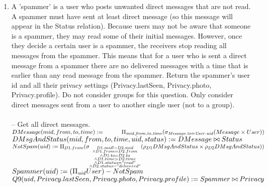 \documentclass{article}
\newcommand{\var}[1]{\mathit{#1}}
\begin{document}
\begin{enumerate}
\item   %
A 'spammer' is a user who posts unwanted direct messages that are not read. A spammer must have sent at least direct message (so this message will appear in the Status relation). Because users may not be aware that someone is a spammer, they may read some of their initial messages. However, once they decide a certain user is a spammer, the receivers stop reading all messages from the spammer. This means that for a user who is sent a direct message from a spammer there are no delivered messages with a time that is earlier than any read message from the spammer. Return the spammer's user id and all their privacy settings (Privacy.lastSeen, Privacy.photo, Privacy.profile). Do not consider groups for this question. Only consider direct messages sent from a user to another single user (not to a group). \\\\ [5pt]
\large{
\hspace*{1cm} -- Get all direct messages. \\ [5pt]
$
DMessage(mid, from, to, time) := \\
\hspace*{1cm} \Pi_{\var{mid}, \var{from}, \var{to}, \var{time}} 
(\sigma_{\var{Message.to} = \var{User.uid}} (Message \times User)) \\\\ [5pt]
$
$DMsgAndStatus(mid, from, to, time, uid, status) := DMessage \bowtie Status \\\\ [5pt]
$
$
NotSpam(uid) := \\
\Pi_{D1.from} (\sigma_{\substack{D1.mid != D2.mid \\
																\wedge D1.from =  D2.from \\
																\wedge D1.to = D2.to \\
																\wedge D1.time > D2.time \\
																\wedge D1.status = "read" \\
																\wedge D2.status = "delivered"}}
																(\rho_{D1} DMsgAndStatus \times 
																\rho_{D2} DMsgAndStatus)) \\\\\\
$
$
Spammer(uid) := (\Pi_{\var{uid}} User) - NotSpam \\\\ [5pt]
$
$
Q9(uid, Privacy.lastSeen, Privacy.photo, Privacy.profile) := Spammer \bowtie Privacy \\ [5pt]													
$
}


\end{enumerate}
\end{document}
